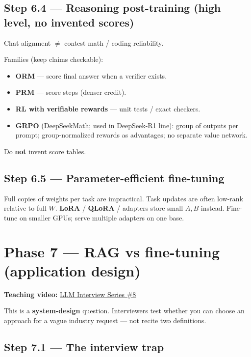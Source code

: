 \documentclass[11pt,a4paper]{article}
\begin{document}
\subsection{Step 6.4 --- Reasoning post-training (high level, no invented scores)}


Chat alignment $\neq$ contest math / coding reliability.


Families (keep claims checkable):

\begin{itemize}
\item \textbf{ORM} --- score final answer when a verifier exists.  
\item \textbf{PRM} --- score steps (denser credit).  
\item \textbf{RL with verifiable rewards} --- unit tests / exact checkers.  
\item \textbf{GRPO} (DeepSeekMath; used in DeepSeek-R1 line): group of outputs per prompt; group-normalized rewards as advantages; no separate value network.
\end{itemize}


Do \textbf{not} invent score tables.


\subsection{Step 6.5 --- Parameter-efficient fine-tuning}


Full copies of weights per task are impractical. Task updates are often low-rank relative to full \(W\). \textbf{LoRA} / \textbf{QLoRA} / adapters store small \(A,B\) instead. Fine-tune on smaller GPUs; serve multiple adapters on one base.


\bigskip


\clearpage
\section{Phase 7 --- RAG vs fine-tuning (application design)}


\textbf{Teaching video:} \href{https://www.youtube.com/watch?v=cCXjumE70-g}{LLM Interview Series \#8}


This is a \textbf{system-design} question. Interviewers test whether you can choose an approach for a vague industry request --- not recite two definitions.


\subsection{Step 7.1 --- The interview trap}
\end{document}

